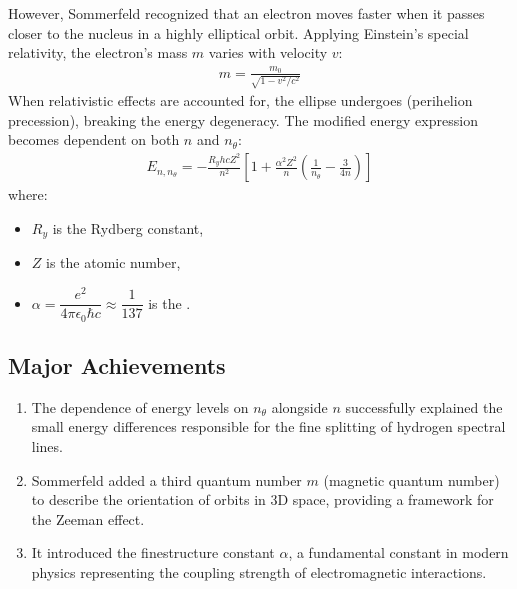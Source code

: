 \documentclass[letterpaper,10pt,english]{jupyterBook}
\begin{document}
\sphinxAtStartPar
However, Sommerfeld recognized that an electron moves faster when it passes closer to the nucleus in a highly elliptical orbit. Applying Einstein’s special relativity, the electron’s mass \(m\) varies with velocity \(v\):
\begin{equation*}
\begin{split}m = \frac{m_0}{\sqrt{1 - v^2/c^2}}\end{split}
\end{equation*}
\sphinxAtStartPar
When relativistic effects are accounted for, the ellipse undergoes  (perihelion precession), breaking the energy degeneracy. The modified energy expression becomes dependent on both \(n\) and \(n_\theta\):
\begin{equation*}
\begin{split}E_{n, n_\theta} = -\frac{R_y h c Z^2}{n^2} \left[ 1 + \frac{\alpha^2 Z^2}{n} \left( \frac{1}{n_\theta} - \frac{3}{4n} \right) \right]\end{split}
\end{equation*}
\sphinxAtStartPar
where:
\begin{itemize}
\item {} 
\sphinxAtStartPar
\(R_y\) is the Rydberg constant,

\item {} 
\sphinxAtStartPar
\(Z\) is the atomic number,

\item {} 
\sphinxAtStartPar
\(\alpha = \dfrac{e^2}{4\pi \epsilon_0 \hbar c} \approx \dfrac{1}{137}\) is the .

\end{itemize}


\subsection{Major Achievements}
\label{\detokenize{ch/quantum-mechanics/atom-models/sommerfeld:major-achievements}}\begin{enumerate}
%
\item {} 
\sphinxAtStartPar
{} The dependence of energy levels on \(n_\theta\) alongside \(n\) successfully explained the small energy differences responsible for the fine splitting of hydrogen spectral lines.

\item {} 
\sphinxAtStartPar
{} Sommerfeld added a third quantum number \(m\) (magnetic quantum number) to describe the orientation of orbits in 3D space, providing a framework for the Zeeman effect.

\item {} 
\sphinxAtStartPar
{} It introduced the fine\sphinxhyphen{}structure constant \(\alpha\), a fundamental constant in modern physics representing the coupling strength of electromagnetic interactions.

\end{enumerate}
\end{document}
